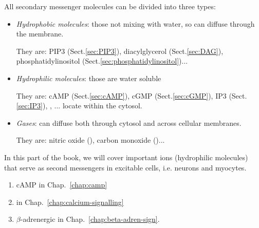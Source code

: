 
All secondary messenger molecules can be divided into three types:
\begin{itemize}

   \item {\it Hydrophobic molecules}: those not mixing with water, so can
   diffuse through the membrane.
   
   They are: PIP3 (Sect.\ref{sec:PIP3}),  diacylglycerol (Sect.\ref{sec:DAG}),
   phosphatidylinositol (Sect.\ref{sec:phosphatidylinositol})...

   \item {\it Hydrophilic molecules}: those are water soluble  
   
   They are: cAMP (Sect.\ref{sec:cAMP}), cGMP (Sect.\ref{sec:cGMP}), IP3
   (Sect.\ref{sec:IP3}), , ... locate within the cytosol.

    \item {\it Gases}: can diffuse both through cytosol and across cellular
  membranes.
    
    They are: nitric oxide (), carbon monoxide
  ()... 
  
\end{itemize}

In this part of the book, we will cover important ions (hydrophilic
molecules) that serve as second messengers in excitable cells,
i.e. neurons and myocytes. 
\begin{enumerate}
\item cAMP in Chap.~\ref{chap:camp}
\item {} in Chap.~\ref{chap:calcium-signalling}
\item $\beta$-adrenergic in Chap.~\ref{chap:beta-adren-sign}. 
\end{enumerate}


